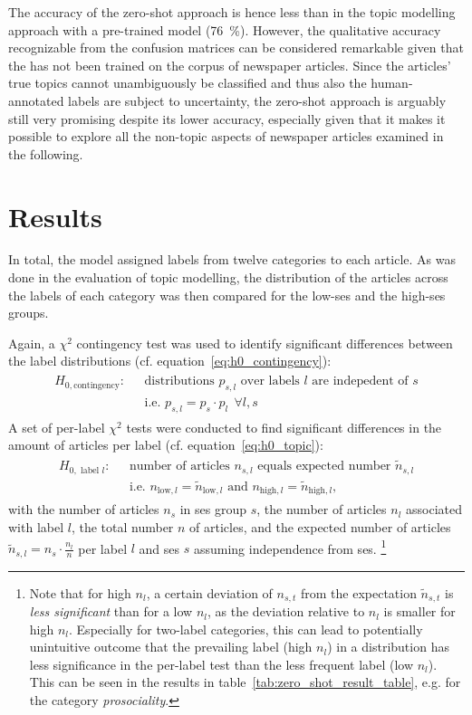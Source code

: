 The accuracy of the zero-shot approach is hence less than in the topic modelling approach with a pre-trained model (\SI{76}{\percent}). However, the qualitative accuracy recognizable from the confusion matrices can be considered remarkable given that the has not been trained on the corpus of newspaper articles. Since the articles' true topics cannot unambiguously be classified and thus also the human-annotated labels are subject to uncertainty, the zero-shot approach is arguably still very promising despite its lower accuracy, especially given that it makes it possible to explore all the non-topic aspects of newspaper articles examined in the following.


\section{Results}\label{ch:supervised_results}
In total, the model assigned labels from twelve categories to each article. As was done in the evaluation of topic modelling, the distribution of the articles across the labels of each category was then compared for the low-\gls{ses} and the high-\gls{ses} groups.

Again, a $\chi^2$ contingency test was used to identify significant differences between the label distributions (cf. equation~\ref{eq:h0_contingency}):
\begin{align}
    \begin{split}
        H_{0, \text{contingency}}: ~~~ &\text{distributions } p_{s, l} \text{ over labels } l \text{ are indepedent of } s\\
    & \text{i.e. } p_{s, l} = p_s \cdot p_l ~~ \forall l, s
    \end{split}
\end{align}
A set of per-label $\chi^2$ tests were conducted to find significant differences in the amount of articles per label (cf. equation~\ref{eq:h0_topic}):
\begin{align}
    \begin{split}
        H_{0, \text{ label }l}: ~~~ &\text{number of articles } n_{s, l} \text{ equals expected number } \tilde n_{s, l} \\
        & \text{i.e. } n_{\text{low}, l} = \tilde n_{\text{low}, l} \text{ and } n_{\text{high}, l} = \tilde n_{\text{high}, l},
    \end{split}
\end{align}
with the number of articles $n_s$ in \gls{ses} group $s$, the number of articles $n_l$ associated with label $l$, the total number $n$ of articles, and the expected number of articles $\tilde n_{s, l} = n_s \cdot \frac{n_l}{n}$ per label $l$ and \gls{ses} $s$ assuming independence from \gls{ses}. \footnote{Note that for high $n_l$, a certain deviation of $n_{s, t}$ from the expectation $\tilde n_{s, t}$ is \textit{less significant} than for a low $n_l$, as the deviation relative to $n_l$ is smaller for high $n_l$. Especially for two-label categories, this can lead to potentially unintuitive outcome that the prevailing label (high $n_l$) in a distribution has less significance in the per-label test than the less frequent label (low $n_l$). This can be seen in the results in table~\ref{tab:zero_shot_result_table}, e.g. for the category \textit{prosociality}.}

